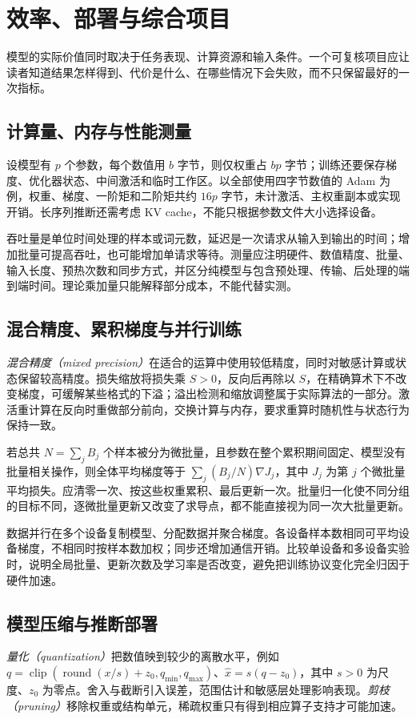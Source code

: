 \setcounter{chapter}{23} %
\chapter{效率、部署与综合项目}
\label{chap:dl-projects}
模型的实际价值同时取决于任务表现、计算资源和输入条件。一个可复核项目应让读者知道结果怎样得到、代价是什么、在哪些情况下会失败，而不只保留最好的一次指标。

\section{计算量、内存与性能测量}
设模型有 $p$ 个参数，每个数值用 $b$ 字节，则仅权重占 $bp$ 字节；训练还要保存梯度、优化器状态、中间激活和临时工作区。以全部使用四字节数值的 Adam 为例，权重、梯度、一阶矩和二阶矩共约 $16p$ 字节，未计激活、主权重副本或实现开销。长序列推断还需考虑 KV cache，不能只根据参数文件大小选择设备。

吞吐量是单位时间处理的样本或词元数，延迟是一次请求从输入到输出的时间；增加批量可提高吞吐，也可能增加单请求等待。测量应注明硬件、数值精度、批量、输入长度、预热次数和同步方式，并区分纯模型与包含预处理、传输、后处理的端到端时间。理论乘加量只能解释部分成本，不能代替实测。

\section{混合精度、累积梯度与并行训练}
\emph{混合精度（mixed precision）}在适合的运算中使用较低精度，同时对敏感计算或状态保留较高精度。损失缩放将损失乘 $S>0$，反向后再除以 $S$，在精确算术下不改变梯度，可缓解某些格式的下溢；溢出检测和缩放调整属于实际算法的一部分。激活重计算在反向时重做部分前向，交换计算与内存，要求重算时随机性与状态行为保持一致。

若总共 $N=\sum_jB_j$ 个样本被分为微批量，且参数在整个累积期间固定、模型没有批量相关操作，则全体平均梯度等于 $\sum_j(B_j/N)\nabla J_j$，其中 $J_j$ 为第 $j$ 个微批量平均损失。应清零一次、按这些权重累积、最后更新一次。批量归一化使不同分组的目标不同，逐微批量更新又改变了求导点，都不能直接视为同一次大批量更新。

数据并行在多个设备复制模型、分配数据并聚合梯度。各设备样本数相同可平均设备梯度，不相同时按样本数加权；同步还增加通信开销。比较单设备和多设备实验时，说明全局批量、更新次数及学习率是否改变，避免把训练协议变化完全归因于硬件加速。

\section{模型压缩与推断部署}
\emph{量化（quantization）}把数值映到较少的离散水平，例如 $q=\operatorname{clip}(\operatorname{round}(x/s)+z_0,q_{\min},q_{\max})$、$\widehat x=s(q-z_0)$，其中 $s>0$ 为尺度、$z_0$ 为零点。舍入与截断引入误差，范围估计和敏感层处理影响表现。\emph{剪枝（pruning）}移除权重或结构单元，稀疏权重只有得到相应算子支持才可能加速。

